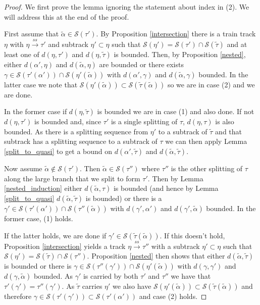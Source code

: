 \documentclass[11pt]{article}
\theoremstyle{remark}
\def\S{{\mathcal S}}
\def\ss{{\overset{ss}\longrightarrow}}
\begin{document}
\begin{proof} We first prove the lemma ignoring the statement about index in (2). We will address this at the end of the proof.

First assume that $\tilde\alpha \in \S(\tau')$. By Proposition \ref{intersection} there is a train track $\eta$ with $\eta \ss \tau'$ and subtrack $\eta' \subset \eta$ such that $\S(\eta') = \S(\tau') \cap \S(\tilde\tau)$ and at least one of $d(\eta, \tau')$ and $d(\eta, \tilde\tau)$ is bounded.
Then, by Proposition \ref{nested}, either $d(\alpha', \eta)$ and $d(\tilde\alpha, \eta)$ are bounded or there exists $\gamma \in \S(\tau'(\alpha'))\cap \S(\eta'(\tilde\alpha))$ with $d(\alpha', \gamma)$ and $d(\tilde\alpha, \gamma)$ bounded. In the latter case we note that $\S(\eta'(\tilde\alpha)) \subset \S(\tilde\tau(\tilde\alpha))$ so we are in case (2) and we are done.

In the former case if $d(\eta, \tilde\tau)$ is bounded we are in case (1) and also done. If not $d(\eta, \tau')$ is bounded and, since $\tau'$ is a single splitting of $\tau$, $d(\eta,\tau)$ is also bounded. As there is a splitting sequence from $\eta'$ to a subtrack of $\tilde\tau$ and that subtrack has a splitting sequence to a subtrack of $\tau$ we can then apply Lemma \ref{split_to_quasi} to get a bound on $d(\alpha', \tilde\tau)$ and $d(\tilde\alpha, \tilde\tau)$.

Now assume $\tilde\alpha \not\in \S(\tau')$. Then $\tilde\alpha \in \S(\tau'')$ where $\tau''$ is the other splitting of $\tau$ along the large branch that we split to form $\tau'$. Then by Lemma \ref{nested_induction} either  $d(\tilde\alpha, \tau)$ is bounded (and hence by Lemma \ref{split_to_quasi} $d(\tilde\alpha,\tilde\tau)$ is bounded) or there is a $\gamma' \in \S(\tau'(\alpha')) \cap \S(\tau''(\tilde\alpha))$ with $d(\gamma', \alpha')$ and $d(\gamma', \tilde\alpha)$ bounded. In the former case, (1) holds.

If the latter holds, we are done if $\gamma' \in \S(\tilde\tau(\tilde\alpha))$. If this doesn't hold, Proposition \ref{intersection} yields a track $\eta \ss \tau''$ with a subtrack $\eta' \subset \eta$ such that $\S(\eta') = \S(\tilde\tau) \cap \S(\tau'')$. Proposition \ref{nested} then shows that either $d(\tilde\alpha, \tilde\tau)$ is bounded or there is $\gamma \in \S(\tau''(\gamma')) \cap \S(\eta'(\tilde\alpha))$ with $d(\gamma, \gamma')$ and $d(\gamma, \tilde\alpha)$ bounded.
As $\gamma'$ is carried by both $\tau'$ and $\tau''$ we have that $\tau'(\gamma') = \tau''(\gamma')$. As $\tilde\tau$ carries $\eta'$ we also have $\S(\eta'(\tilde\alpha)) \subset \S(\tilde\tau(\tilde\alpha))$ and therefore $\gamma \in \S(\tau'(\gamma')) \subset \S(\tau'(\alpha'))$ and case (2) holds.


\end{proof}
\end{document}
